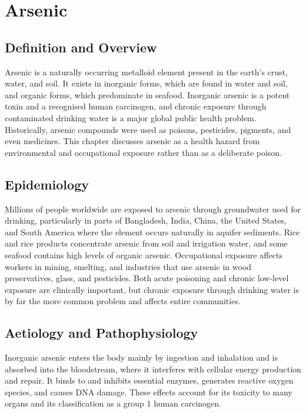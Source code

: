 \chapter{Arsenic}

\section*{Definition and Overview}
Arsenic is a naturally occurring metalloid element present in the earth's crust, water, and soil. It exists in inorganic forms, which are found in water and soil, and organic forms, which predominate in seafood. Inorganic arsenic is a potent toxin and a recognised human carcinogen, and chronic exposure through contaminated drinking water is a major global public health problem. Historically, arsenic compounds were used as poisons, pesticides, pigments, and even medicines. This chapter discusses arsenic as a health hazard from environmental and occupational exposure rather than as a deliberate poison.

\section*{Epidemiology}
Millions of people worldwide are exposed to arsenic through groundwater used for drinking, particularly in parts of Bangladesh, India, China, the United States, and South America where the element occurs naturally in aquifer sediments. Rice and rice products concentrate arsenic from soil and irrigation water, and some seafood contains high levels of organic arsenic. Occupational exposure affects workers in mining, smelting, and industries that use arsenic in wood preservatives, glass, and pesticides. Both acute poisoning and chronic low-level exposure are clinically important, but chronic exposure through drinking water is by far the more common problem and affects entire communities.

\section*{Aetiology and Pathophysiology}
Inorganic arsenic enters the body mainly by ingestion and inhalation and is absorbed into the bloodstream, where it interferes with cellular energy production and repair. It binds to and inhibits essential enzymes, generates reactive oxygen species, and causes DNA damage. These effects account for its toxicity to many organs and its classification as a group 1 human carcinogen.

